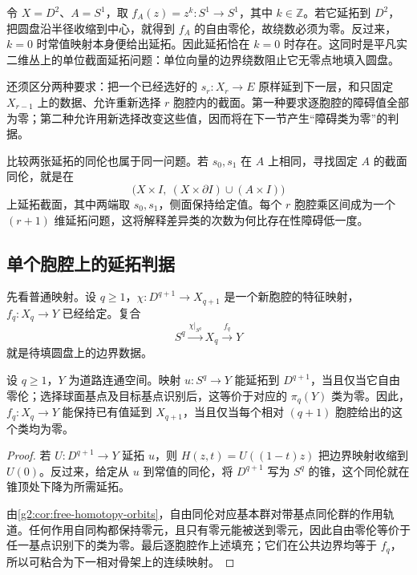 \begin{example}\label{g2:exm:boundary-winding-extension}
	令 \(X=D^2\)、\(A=S^1\)，取 \(f_A(z)=z^k:S^1\to S^1\)，其中 \(k\in\mathbb Z\)。若它延拓到 \(D^2\)，把圆盘沿半径收缩到中心，就得到 \(f_A\) 的自由零伦，故绕数必须为零。反过来，\(k=0\) 时常值映射本身便给出延拓。因此延拓恰在 \(k=0\) 时存在。这同时是平凡实二维丛上的单位截面延拓问题：单位向量的边界绕数阻止它无零点地填入圆盘。
\end{example}

还须区分两种要求：把一个已经选好的 \(s_r:X_r\to E\) 原样延到下一层，和只固定 \(X_{r-1}\) 上的数据、允许重新选择 \(r\) 胞腔内的截面。第一种要求逐胞腔的障碍值全部为零；第二种允许用新选择改变这些值，因而将在下一节产生“障碍类为零”的判据。

\ProseParagraphBreak

比较两张延拓的同伦也属于同一问题。若 \(s_0,s_1\) 在 \(A\) 上相同，寻找固定 \(A\) 的截面同伦，就是在
\[
	\bigl(X\times I,\ (X\times\partial I)\cup(A\times I)\bigr)
\]
上延拓截面，其中两端取 \(s_0,s_1\)，侧面保持给定值。每个 \(r\) 胞腔乘区间成为一个 \((r+1)\) 维延拓问题，这将解释差异类的次数为何比存在性障碍低一度。

\subsection{单个胞腔上的延拓判据}
\label{g2:subsec:1201:02}

先看普通映射。设 \(q\ge1\)，\(\chi:D^{q+1}\to X_{q+1}\) 是一个新胞腔的特征映射，\(f_q:X_q\to Y\) 已经给定。复合
\[
	S^q\xrightarrow{\chi|_{S^q}}X_q\xrightarrow{f_q}Y
\]
就是待填圆盘上的边界数据。

\begin{proposition}\label{g2:prop:cell-extension-criterion}
	设 \(q\ge1\)，\(Y\) 为道路连通空间。映射 \(u:S^q\to Y\) 能延拓到 \(D^{q+1}\)，当且仅当它自由零伦；选择球面基点及目标基点识别后，这等价于对应的 \(\pi_q(Y)\) 类为零。因此，\(f_q:X_q\to Y\) 能保持已有值延到 \(X_{q+1}\)，当且仅当每个相对 \((q+1)\) 胞腔给出的这个类均为零。
\end{proposition}
\begin{proof}
	若 \(U:D^{q+1}\to Y\) 延拓 \(u\)，则 \(H(z,t)=U((1-t)z)\) 把边界映射收缩到 \(U(0)\)。反过来，给定从 \(u\) 到常值的同伦，将 \(D^{q+1}\) 写为 \(S^q\) 的锥，这个同伦就在锥顶处下降为所需延拓。

	由\cref{g2:cor:free-homotopy-orbits}，自由同伦对应基本群对带基点同伦群的作用轨道。任何作用自同构都保持零元，且只有零元能被送到零元，因此自由零伦等价于任一基点识别下的类为零。最后逐胞腔作上述填充；它们在公共边界均等于 \(f_q\)，所以可粘合为下一相对骨架上的连续映射。
\end{proof}


